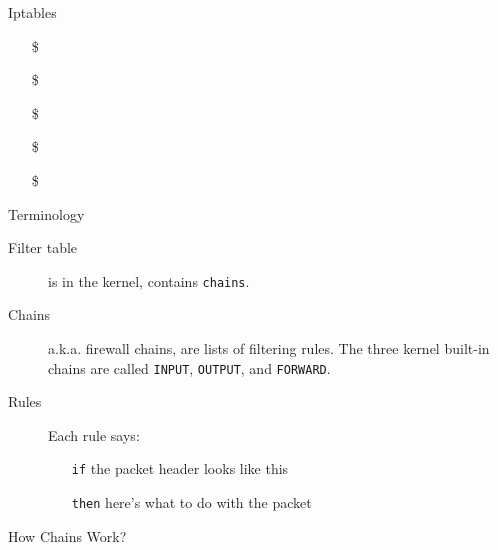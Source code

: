 \begin{frame}{Iptables}
  \begin{itemize}
  \item[\$] 
  \item[\$] 
  \item[\$] 
  \item[\$] 
  \item[\$] 
  \end{itemize}
\end{frame}

\begin{frame}{Terminology}
  \begin{description}
  \item[Filter table] is in the kernel, contains \texttt{chains}.
  \item[Chains] a.k.a. firewall chains, are lists of filtering rules. The three kernel
    built-in chains are called \texttt{INPUT}, \texttt{OUTPUT}, and \texttt{FORWARD}.
  \item[Rules] Each rule says:
    \begin{itemize}
    \item[\texttt{if}] the packet header looks like this
    \item[\texttt{then}] here's what to do with the packet
    \end{itemize}
  \end{description}
\end{frame}

\begin{frame}{How Chains Work?}
  \centering
\end{frame}

